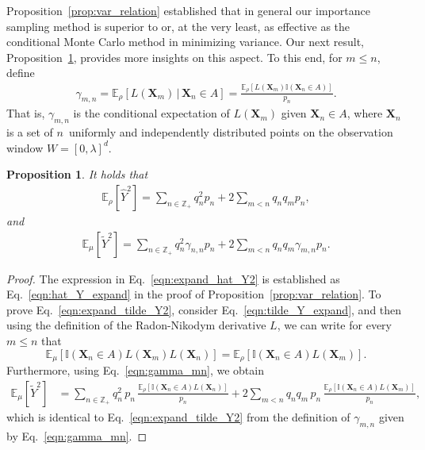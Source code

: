\documentclass[pdflatex, sn-mathphys-ay]{sn-jnl}%
\newcommand{\intg}{\mathbb{Z}}
\newcommand{\ind}{\mathbb{I}}
\renewcommand{\v}[1]{\boldsymbol{#1}}
\newcommand{\ee}{\mathbb{E}}
\newcommand{\mX}{\v{X}}
\newcommand{\lt}{\left}
\newcommand{\rt}{\right}
\newcommand{\wt}{\widetilde}
\newcommand{\wh}{\widehat}
\theoremstyle{thmstyleone}%
\newtheorem{proposition}[theorem]{Proposition}%
\theoremstyle{thmstyletwo}%
\theoremstyle{thmstylethree}%
\begin{document}
Proposition~\ref{prop:var_relation} established that in general our importance sampling method is 
superior to or, at the very least, as effective as the conditional Monte Carlo method in minimizing variance. 
Our next result, Proposition~\ref{prop:gamma_improve}, provides more insights on this aspect. 
To this end, for $m \leq n$, define
\begin{align}
\gamma_{m,n} = \ee_\rho\lt[L(\mX_{m})\,\big| \,\mX_n \in A\rt] = \frac{\ee_\rho[L(\mX_{m})\ind(\mX_n \in A)]}{p_n}. \label{eqn:gamma_mn}
\end{align}
That is, $\gamma_{m, n}$ is the conditional expectation of $L(\mX_m)$ given $\mX_n \in A$, where $\mX_n$ is a set of $n$~uniformly and independently 
distributed points on the observation window $W = [0, \lambda]^d$. 
\begin{proposition} 
\label{prop:gamma_improve}
It holds that
\begin{align}
\label{eqn:expand_hat_Y2}
\ee_\rho[\wh Y^2] = \sum_{n \in \intg_+} q_n^2 p_n + 2\sum_{m < n} q_n q_m p_n,
\end{align}
and 
\begin{align}
\label{eqn:expand_tilde_Y2}
\ee_\mu[\wt Y^2] = \sum_{n \in \intg_+} q_n^2 \gamma_{n,n}p_n + 2\sum_{m < n} q_n q_m \gamma_{m, n}p_n.
\end{align}
\end{proposition}

\begin{proof}
The expression in Eq.~\eqref{eqn:expand_hat_Y2} is established as Eq.~\eqref{eqn:hat_Y_expand} in the proof of Proposition~\ref{prop:var_relation}. To prove Eq.~\eqref{eqn:expand_tilde_Y2}, consider Eq.~\eqref{eqn:tilde_Y_expand}, and then using the definition of the Radon-Nikodym derivative $L$,  we can write for every $m \leq n$ that
\[
\ee_\mu\lt[\ind(\mX_n \in A) L(\mX_m) L(\mX_n)\rt] = \ee_\rho\lt[\ind(\mX_n \in A) L(\mX_m)\rt]. 
\]
Furthermore, using Eq.~\eqref{eqn:gamma_mn}, we obtain
\begin{align*}
\ee_\mu[\wt Y^2] &= \sum_{n \in \intg_+} q_n^2\, p_n\, \frac{\ee_\rho\lt[\ind(\mX_n \in A) L(\mX_{n}) \rt]}{p_n} + 2 \sum_{ m < n } q_n q_m \, p_n\, \frac{\ee_\rho\lt[\ind(\mX_n \in A) L(\mX_{m}) \rt]}{p_n},
\end{align*}
which is identical to Eq.~\eqref{eqn:expand_tilde_Y2} from the definition of $\gamma_{m, n}$ given by Eq.~\eqref{eqn:gamma_mn}.
\end{proof}
\end{document}
